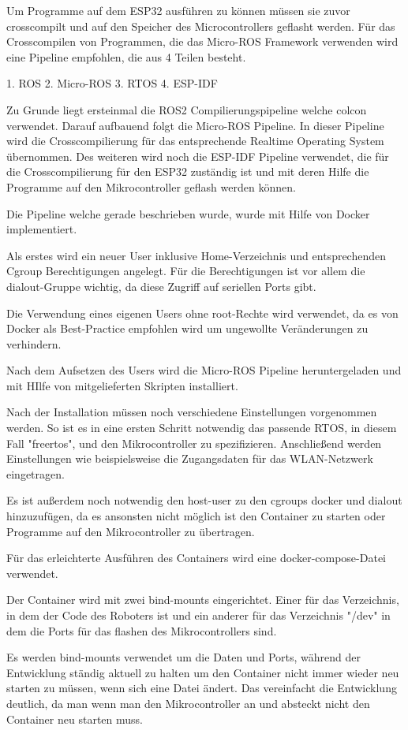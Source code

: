 \begin{flushleft}


    Um Programme auf dem ESP32 ausführen zu können müssen sie zuvor crosscompilt und auf den Speicher des Microcontrollers geflasht werden.
    Für das Crosscompilen von Programmen, die das Micro-ROS Framework verwenden wird eine Pipeline empfohlen, die aus 4 Teilen besteht.

    1. ROS
    2. Micro-ROS
    3. RTOS
    4. ESP-IDF

    Zu Grunde liegt ersteinmal die ROS2 Compilierungspipeline welche colcon verwendet.
    Darauf aufbauend folgt die Micro-ROS Pipeline. In dieser Pipeline wird die Crosscompilierung für das entsprechende Realtime Operating System übernommen.
    Des weiteren wird noch die ESP-IDF Pipeline verwendet, die für die Crosscompilierung für den ESP32 zuständig ist und mit deren Hilfe die Programme auf den Mikrocontroller geflash werden können.

    Die Pipeline welche gerade beschrieben wurde, wurde mit Hilfe von Docker implementiert.

    Als erstes wird ein neuer User inklusive Home-Verzeichnis und entsprechenden Cgroup Berechtigungen angelegt.
    Für die Berechtigungen ist vor allem die dialout-Gruppe wichtig, da diese Zugriff auf seriellen Ports gibt.

    Die Verwendung eines eigenen Users ohne root-Rechte wird verwendet, 
    da es von Docker als Best-Practice empfohlen wird um ungewollte Veränderungen zu verhindern.


    Nach dem Aufsetzen des Users wird die Micro-ROS Pipeline heruntergeladen und mit HIlfe von mitgelieferten Skripten installiert.

    Nach der Installation müssen noch verschiedene Einstellungen vorgenommen werden. So ist es in eine ersten Schritt notwendig das passende RTOS, in diesem Fall "freertos",
    und den Mikrocontroller zu spezifizieren. Anschließend werden Einstellungen wie beispielsweise die Zugangsdaten für das WLAN-Netzwerk eingetragen.

    Es ist außerdem noch notwendig den host-user zu den cgroups docker und dialout hinzuzufügen, 
    da es ansonsten nicht möglich ist den Container zu starten oder Programme auf den Mikrocontroller zu übertragen.


    Für das erleichterte Ausführen des Containers wird eine docker-compose-Datei verwendet.

    Der Container wird mit zwei bind-mounts eingerichtet. Einer für das Verzeichnis, 
    in dem der Code des Roboters ist und ein anderer für das Verzeichnis "/dev" in dem die Ports für das flashen des Mikrocontrollers sind.

    Es werden bind-mounts verwendet um die Daten und Ports, während der Entwicklung ständig aktuell zu halten um den Container nicht immer wieder neu starten zu müssen, wenn sich eine Datei ändert.
    Das vereinfacht die Entwicklung deutlich, da man wenn man den Mikrocontroller an und absteckt nicht den Container neu starten muss.
    
\end{flushleft}
